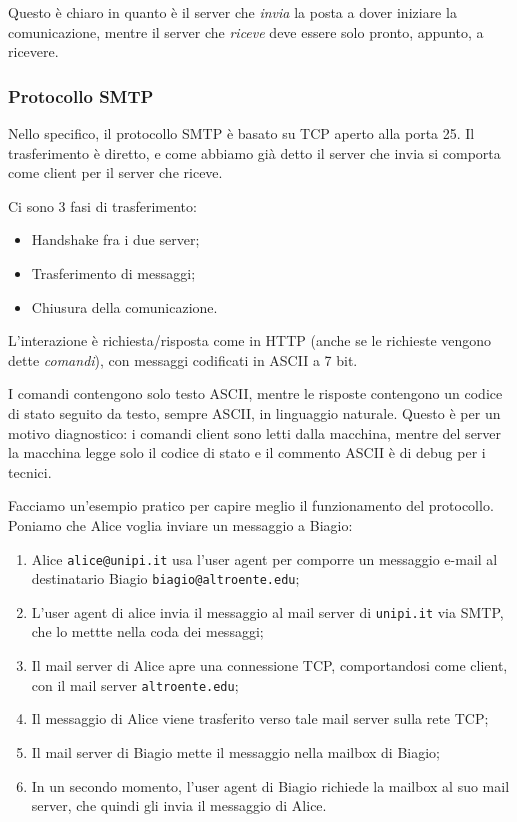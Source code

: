 \documentclass[a4paper,11pt]{article}
\begin{document}
Questo è chiaro in quanto è il server che \textit{invia} la posta a dover iniziare la comunicazione, mentre il server che \textit{riceve} deve essere solo pronto, appunto, a ricevere.

\subsubsection{Protocollo SMTP}
Nello specifico, il protocollo SMTP è basato su TCP aperto alla porta 25.
Il trasferimento è diretto, e come abbiamo già detto il server che invia si comporta come client per il server che riceve.

Ci sono 3 fasi di trasferimento:
\begin{itemize}
	\item Handshake fra i due server;
	\item Trasferimento di messaggi;
	\item Chiusura della comunicazione.
\end{itemize}

L'interazione è richiesta/risposta come in HTTP (anche se le richieste vengono dette \textit{comandi}), con messaggi codificati in ASCII a 7 bit.

I comandi contengono solo testo ASCII, mentre le risposte contengono un codice di stato seguito da testo, sempre ASCII, in linguaggio naturale.
Questo è per un motivo diagnostico: i comandi client sono letti dalla macchina, mentre del server la macchina legge solo il codice di stato e il commento ASCII è di debug per i tecnici. 

\par\smallskip

Facciamo un'esempio pratico per capire meglio il funzionamento del protocollo. Poniamo che Alice voglia inviare un messaggio a Biagio:
\begin{enumerate}
	\item Alice \lstinline|alice@unipi.it| usa l'user agent per comporre un messaggio e-mail al destinatario Biagio \lstinline|biagio@altroente.edu|;
	\item L'user agent di alice invia il messaggio al mail server di \lstinline|unipi.it| via SMTP, che lo mettte nella coda dei messaggi;
	\item Il mail server di Alice apre una connessione TCP, comportandosi come client, con il mail server \lstinline|altroente.edu|;
	\item Il messaggio di Alice viene trasferito verso tale mail server sulla rete TCP;
	\item Il mail server di Biagio mette il messaggio nella mailbox di Biagio;
	\item In un secondo momento, l'user agent di Biagio richiede la mailbox al suo mail server, che quindi gli invia il messaggio di Alice. 
\end{enumerate}
\end{document}
